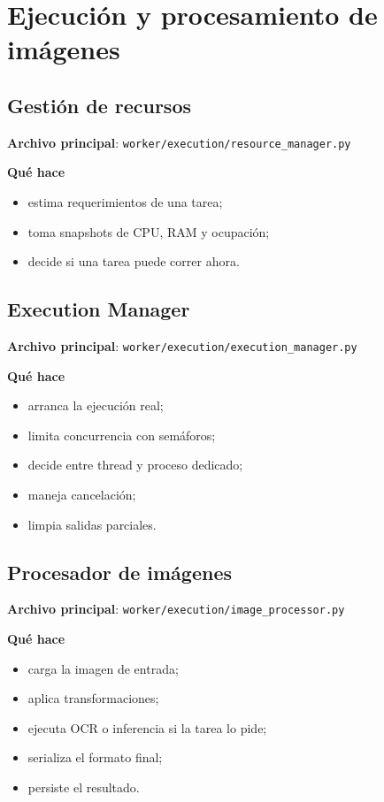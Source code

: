 \documentclass[11pt]{article}
\begin{document}
\section{Ejecución y procesamiento de imágenes}

\subsection{Gestión de recursos}
\textbf{Archivo principal}: \texttt{worker/execution/resource\_manager.py}

\textbf{Qué hace}
\begin{itemize}
\item estima requerimientos de una tarea;
\item toma snapshots de CPU, RAM y ocupación;
\item decide si una tarea puede correr ahora.
\end{itemize}

\subsection{Execution Manager}
\textbf{Archivo principal}: \texttt{worker/execution/execution\_manager.py}

\textbf{Qué hace}
\begin{itemize}
\item arranca la ejecución real;
\item limita concurrencia con semáforos;
\item decide entre thread y proceso dedicado;
\item maneja cancelación;
\item limpia salidas parciales.
\end{itemize}

\subsection{Procesador de imágenes}
\textbf{Archivo principal}: \texttt{worker/execution/image\_processor.py}

\textbf{Qué hace}
\begin{itemize}
\item carga la imagen de entrada;
\item aplica transformaciones;
\item ejecuta OCR o inferencia si la tarea lo pide;
\item serializa el formato final;
\item persiste el resultado.
\end{itemize}
\end{document}
